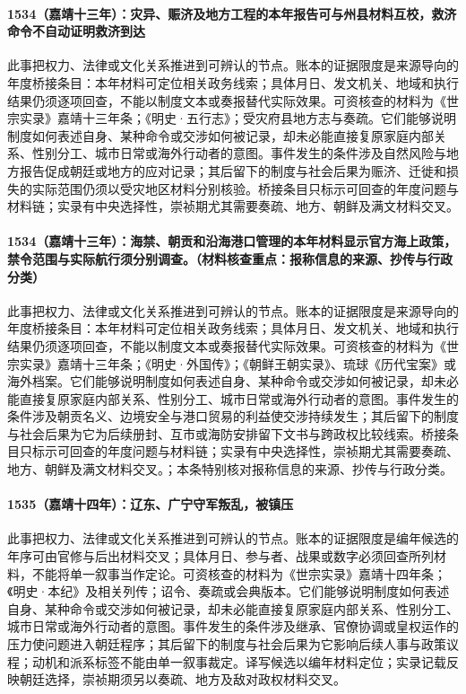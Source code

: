 \paragraph{1534（嘉靖十三年）：灾异、赈济及地方工程的本年报告可与州县材料互校，救济命令不自动证明救济到达} 此事把权力、法律或文化关系推进到可辨认的节点。账本的证据限度是来源导向的年度桥接条目：本年材料可定位相关政务线索；具体月日、发文机关、地域和执行结果仍须逐项回查，不能以制度文本或奏报替代实际效果。可资核查的材料为《世宗实录》嘉靖十三年条；《明史·五行志》；受灾府县地方志与奏疏。它们能够说明制度如何表述自身、某种命令或交涉如何被记录，却未必能直接复原家庭内部关系、性别分工、城市日常或海外行动者的意图。事件发生的条件涉及自然风险与地方报告促成朝廷或地方的应对记录；其后留下的制度与社会后果为赈济、迁徙和损失的实际范围仍须以受灾地区材料分别核验。桥接条目只标示可回查的年度问题与材料链；实录有中央选择性，崇祯期尤其需要奏疏、地方、朝鲜及满文材料交叉。

\paragraph{1534（嘉靖十三年）：海禁、朝贡和沿海港口管理的本年材料显示官方海上政策，禁令范围与实际航行须分别调查。（材料核查重点：报称信息的来源、抄传与行政分类）} 此事把权力、法律或文化关系推进到可辨认的节点。账本的证据限度是来源导向的年度桥接条目：本年材料可定位相关政务线索；具体月日、发文机关、地域和执行结果仍须逐项回查，不能以制度文本或奏报替代实际效果。可资核查的材料为《世宗实录》嘉靖十三年条；《明史·外国传》；《朝鲜王朝实录》、琉球《历代宝案》或海外档案。它们能够说明制度如何表述自身、某种命令或交涉如何被记录，却未必能直接复原家庭内部关系、性别分工、城市日常或海外行动者的意图。事件发生的条件涉及朝贡名义、边境安全与港口贸易的利益使交涉持续发生；其后留下的制度与社会后果为它为后续册封、互市或海防安排留下文书与跨政权比较线索。桥接条目只标示可回查的年度问题与材料链；实录有中央选择性，崇祯期尤其需要奏疏、地方、朝鲜及满文材料交叉。；本条特别核对报称信息的来源、抄传与行政分类。

\paragraph{1535（嘉靖十四年）：辽东、广宁守军叛乱，被镇压} 此事把权力、法律或文化关系推进到可辨认的节点。账本的证据限度是编年候选的年序可由官修与后出材料交叉；具体月日、参与者、战果或数字必须回查所列材料，不能将单一叙事当作定论。可资核查的材料为《世宗实录》嘉靖十四年条；《明史·本纪》及相关列传；诏令、奏疏或会典版本。它们能够说明制度如何表述自身、某种命令或交涉如何被记录，却未必能直接复原家庭内部关系、性别分工、城市日常或海外行动者的意图。事件发生的条件涉及继承、官僚协调或皇权运作的压力使问题进入朝廷程序；其后留下的制度与社会后果为它影响后续人事与政策议程；动机和派系标签不能由单一叙事裁定。译写候选以编年材料定位；实录记载反映朝廷选择，崇祯期须另以奏疏、地方及敌对政权材料交叉。

